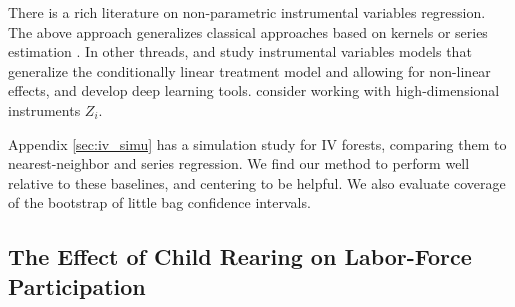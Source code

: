 \documentclass[aos]{imsart}
\theoremstyle{plain}
\theoremstyle{definition}
\theoremstyle{remark}
\begin{document}
\begin{CJK}{UTF8}{gbsn}
{There is a rich literature on non-parametric instrumental variables regression. The above approach
generalizes classical approaches based on kernels or series estimation
\citep{abadie2003semiparametric,su2013local,wooldridge2010econometric}. In other threads,
\citet{darolles2011nonparametric} and \citet{newey2003instrumental} study instrumental variables
models that generalize the conditionally linear treatment model and allowing for non-linear
effects, and \citet{hartford2016counterfactual} develop deep learning tools.
\citet{belloni2012sparse} consider working with high-dimensional instruments $Z_i$.

Appendix \ref{sec:iv_simu} has a simulation study for IV forests, comparing
them to nearest-neighbor and series regression. We find our method to perform well relative to these
baselines, and centering to be helpful. We also evaluate
coverage of the bootstrap of little bag confidence intervals.

\subsection{The Effect of Child Rearing on Labor-Force Participation}
\label{sec:angrist_evans}

}
\end{CJK}
\end{document}

